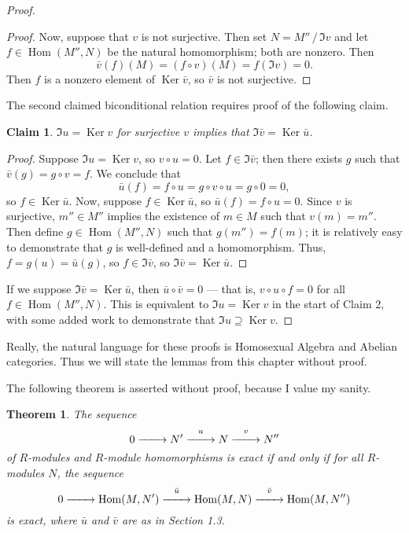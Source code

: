 \documentclass[11pt]{article}
\newtheorem{theorem}{Theorem}
\newtheorem{claim}{Claim}
\newcommand{\Hom}{\operatorname{Hom}}
\newcommand{\Ker}{\operatorname{Ker}}
\renewcommand{\longrightarrow}{\xrightarrow{\hspace*{0.7cm}}}
\begin{document}
\begin{adjustwidth}{1cm}{}
\begin{proof}
\begin{adjustwidth}{1cm}{}
\begin{proof}
				Now, suppose that $v$ is not surjective. Then set $N = M'' \,/\, \Im v$ and let $f \in \Hom(M'', N)$ be the natural homomorphism; both are nonzero. Then
				\[
					\bar{v}(f)(M) = (f \circ v)(M) = f(\Im v) = 0.
				\]
				Then $f$ is a nonzero element of $\Ker \bar{v}$, so $\bar{v}$ is not surjective.
			\end{proof}
		\end{adjustwidth}
		The second claimed biconditional relation requires proof of the following claim.
		\begin{adjustwidth}{1cm}{}
			\begin{claim}
				$\Im u = \Ker v$ for surjective $v$ implies that $\Im \bar{v} = \Ker \bar{u}$.
			\end{claim}
			\begin{proof}\renewcommand{\qedsymbol}{}
				Suppose $\Im u = \Ker v$, so $v \circ u = 0$. Let $f \in \Im \bar{v}$; then there exists $g$ such that $\bar{v}(g) = g \circ v = f$. We conclude that
				\[
					\bar{u}(f) = f \circ u = g \circ v \circ u = g \circ 0 = 0,
				\]
				so $f \in \Ker \bar{u}$. Now, suppose $f \in \Ker \bar{u}$, so $\bar{u}(f) = f \circ u = 0$. Since $v$ is surjective, $m'' \in M''$ implies the existence of $m \in M$ such that $v(m) = m''$. Then define $g \in \Hom(M'', N)$ such that $g(m'') = f(m)$; it is relatively easy to demonstrate that $g$ is well-defined and a homomorphism. Thus, $f = g(u) = \bar{u}(g)$, so $f \in \Im \bar{v}$, so $\Im \bar{v} = \Ker \bar{u}$.
			\end{proof}
		\end{adjustwidth}
		If we suppose $\Im \bar{v} = \Ker \bar{u}$, then $\bar{u} \circ \bar{v} = 0$ --- that is, $v \circ u \circ f = 0$ for all $f \in \Hom(M'', N)$. This is equivalent to $\Im u = \Ker v$ in the start of Claim 2, with some added work to demonstrate that $\Im u \supseteq \Ker v$.
	\end{proof}
\end{adjustwidth}

Really, the natural language for these proofs is Homosexual Algebra and Abelian categories. Thus we will state the lemmas from this chapter without proof.

\newpage

The following theorem is asserted without proof, because I value my sanity.

\begin{adjustwidth}{1cm}{}
  \begin{theorem}
		The sequence
		\[
			0 \longrightarrow N' \stackrel{u}{\longrightarrow} N \stackrel{v}{\longrightarrow} N''
    \]
		of $R$-modules and $R$-module homomorphisms is exact if and only if for all $R$-modules $N$, the sequence
		\[
			0 \longrightarrow \Hom(M, N') \stackrel{\bar{u}}{\longrightarrow} \Hom(M, N) \stackrel{\bar{v}}{\longrightarrow} \Hom(M, N'')
    \]
		is exact, where $\bar{u}$ and $\bar{v}$ are as in Section 1.3.
  \end{theorem}
\end{adjustwidth}
\end{document}
